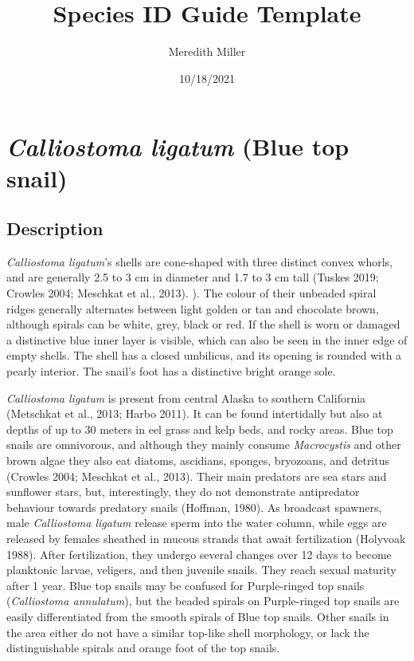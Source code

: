 \documentclass[
]{article}
\title{Species ID Guide Template}
\author{Meredith Miller}
\date{10/18/2021}
\begin{document}
\maketitle

\newpage

\hypertarget{calliostoma-ligatum-blue-top-snail}{%
\section{\texorpdfstring{\emph{Calliostoma ligatum} (Blue top
snail)}{Calliostoma ligatum (Blue top snail)}}\label{calliostoma-ligatum-blue-top-snail}}

\hypertarget{description}{%
\subsection{Description}\label{description}}

\emph{Calliostoma ligatum}'s shells are cone-shaped with three distinct
convex whorls, and are generally 2.5 to 3 cm in diameter and 1.7 to 3 cm
tall (Tuskes 2019; Crowles 2004; Meschkat et al., 2013). ). The colour
of their unbeaded spiral ridges generally alternates between light
golden or tan and chocolate brown, although spirals can be white, grey,
black or red. If the shell is worn or damaged a distinctive blue inner
layer is visible, which can also be seen in the inner edge of empty
shells. The shell has a closed umbilicus, and its opening is rounded
with a pearly interior. The snail's foot has a distinctive bright orange
sole.

\emph{Calliostoma ligatum} is present from central Alaska to southern
California (Metschkat et al., 2013; Harbo 2011). It can be found
intertidally but also at depths of up to 30 meters in eel grass and kelp
beds, and rocky areas. Blue top snails are omnivorous, and although they
mainly consume \emph{Macrocystis} and other brown algae they also eat
diatoms, ascidians, sponges, bryozoans, and detritus (Crowles 2004;
Meschkat et al., 2013). Their main predators are sea stars and sunflower
stars, but, interestingly, they do not demonstrate antipredator
behaviour towards predatory snails (Hoffman, 1980). As broadcast
spawners, male \emph{Calliostoma ligatum} release sperm into the water
column, while eggs are released by females sheathed in mucous strands
that await fertilization (Holyvoak 1988). After fertilization, they
undergo several changes over 12 days to become planktonic larvae,
veligers, and then juvenile snails. They reach sexual maturity after 1
year. Blue top snails may be confused for Purple-ringed top snails
(\emph{Calliostoma annulatum}), but the beaded spirals on Purple-ringed
top snails are easily differentiated from the smooth spirals of Blue top
snails. Other snails in the area either do not have a similar top-like
shell morphology, or lack the distinguishable spirals and orange foot of
the top snails.
\end{document}
